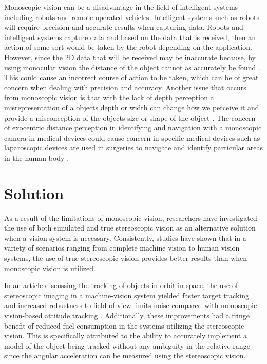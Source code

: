 \documentclass[12pt, journal]{IEEEtran}
\begin{document}
Monoscopic vision can be a disadvantage in the field of intelligent systems including robots and remote operated vehicles. Intelligent systems such as robots will require precision and accurate results when capturing data. Robots and intelligent systems capture data and based on the data that is received, then an action of some sort would be taken by the robot depending on the application. However, since the 2D data that will be received may be inaccurate because, by using monocular vision the distance of the object cannot as accurately be found \cite{segal}. This could cause an incorrect course of action to be taken, which can be of great concern when dealing with precision and accuracy. Another issue that occurs from monoscopic vision is that with the lack of depth perception a misrepresentation of a objects depth or width can change how we perceive it and provide a misconception of the objects size or shape of the object \cite{pollock}. The concern of exocentric distance perception in identifying and navigation with a monoscopic camera in medical devices could cause concern in specific medical devices such as laparoscopic devices are used in surgeries to navigate and identify particular areas in the human body \cite{pollock}. 

\section{Solution}
As a result of the limitations of monoscopic vision, researchers have investigated the use of both simulated and true stereoscopic vision as an alternative solution when a vision system is necessary.  Consistently, studies have shown that in a variety of scenarios ranging from complete machine vision to human vision systems, the use of true stereoscopic vision provides better results than when monoscopic vision is utilized.

In an article discussing the tracking of objects in orbit in space, the use of stereoscopic imaging in a machine-vision system yielded faster target tracking and increased robustness to field-of-view limits noise compared with monoscopic vision-based attitude tracking \cite{segal}. Additionally, these improvements had a fringe benefit of reduced fuel consumption in the systems utilizing the stereoscopic vision.  This is specifically attributed to the ability to accurately implement a model of the object being tracked without any ambiguity in the relative range since the angular acceleration can be measured using the stereoscopic vision.  
\end{document}
